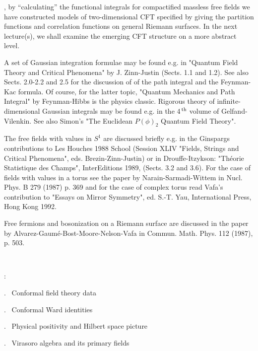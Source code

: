 , by ``calculating'' the functional integrals
for compactified massless free fields we have constructed models
of two-dimensional CFT specified
by giving the partition functions and correlation functions
on general Riemann surfaces. In the next lecture(s), we shall
examine the emerging CFT structure on a more abstract level.
\vskip 0.8cm

\vskip 0.4cm

A set of Gaussian integration formulae may be found
e.g. in "Quantum Field Theory and Critical Phenomena"
by J. Zinn-Justin (Sects. 1.1 and 1.2). See also Sects. 2.0-2.2
and 2.5 for the discussion  of of the path integral and
the Feynman-Kac formula. Of course, for the latter topic,
"Quantum Mechanics and Path Integral" by Feynman-Hibbs is
the physics classic. Rigorous theory of infinite-dimensional
Gaussian integrals may be found e.g. in the 4$^{\hspace{0.025cm}\rm th}$
volume of Gelfand-Vilenkin. See also Simon's "The Euclidean
$P(\phi)_2$ Quantum Field Theory".
\vskip 0.3cm

The free fields with values in $S^1$ are discussed
briefly e.g. in the Ginspargs contributions to Les Houches 1988 School
(Session XLIV "Fields, Strings and Critical Phenomena", eds.
Brezin-Zinn-Justin) or in Drouffe-Itzykson:
"Th\'{e}orie Statistique des Champs", InterEditions 1989,
(Sects. 3.2 and 3.6). \m For the case of fields
with values in a torus see the paper by Narain-Sarmadi-Wittem
in Nucl. Phys. B 279 (1987) p. 369 and for the case of complex torus
read Vafa's contribution to "Essays on Mirror Symmetry", ed. S.-T. Yau,
International Press, Hong Kong 1992.
\vskip 0.3cm

Free fermions and bosonization on a Riemann surface are discussed
in the paper by Alvarez-Gaum\'{e}-Bost-Moore-Nelson-Vafa
in Commun. Math. Phys. 112 (1987), p. 503.

\eject



\
\vskip 0.8cm

\addtocounter{equation}{-27}
\vskip 0.8cm


\no{}:
\vskip 0.5cm

. \ Conformal field theory data

. \ Conformal Ward identities

. \ Physical positivity and Hilbert space picture

. \ Virasoro algebra and its primary fields

